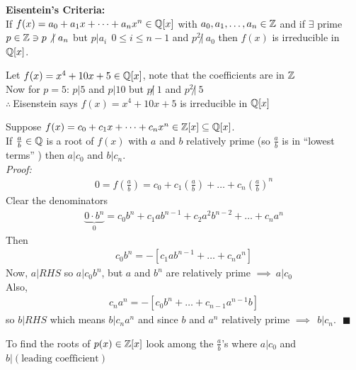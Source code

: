 \newpage
\begin{tcolorbox}
    \textbf{Eisentein's Criteria:} \\ \steezybreak 
    If $f(x)=a_0+a_1x+ \dots + a_n x^n \in {\mathbb{ Q}}[x]$ with $a_0, a_1, \dots, a_n \in {\mathbb{ Z}}$ and if $\exists$ prime $p\in {\mathbb{ Z}}\ni p \not | \ a_n$ but $p|a_i \ \ 0\leq i \leq n-1$ and $p^2 \not | \ a_0$ then $f(x)$ is irreducible in ${\mathbb{ Q}}[x]$.
\end{tcolorbox}
\begin{example}
    Let $f(x)= x^4 + 10x + 5 \in {\mathbb{ Q}}[x]$, note that the coefficients are in ${\mathbb{ Z}}$ \\
    Now for $p=5$: $p|5$ and $p|10$ but $p\not | \ 1$ and $p^2 \not | \ 5$ \\
    $\therefore \ $Eisenstein says $f(x)=x^4+10x+5$ is irreducible in ${\mathbb{ Q}}[x]$
\end{example}
\begin{lemma*}
    Suppose $f(x) = c_0 + c_1x + \dots + c_n x^n \in {\mathbb{ Z}}[x] \subseteq {\mathbb{ Q}}[x]$. \\
    If $\frac{a}{b} \in {\mathbb{ Q}}$ is a root of $f(x)$ with $a$ and $b$ relatively prime (so $\frac{a}{b}$ is in ``lowest terms'' ) then $a|c_0$ and $b|c_n$. \\

    \noindent \textit{Proof: }
    \begin{align*}
        0 = f\left(\frac{a}{b}\right)= c_0 + c_1\left(\frac{a}{b}\right) + \dots + c_n\left(\frac{a}{b}\right)^n
    \end{align*}
    Clear the denominators
    \begin{align*}
        \underbrace{0\cdot b^n}_{0} =  c_0b^n + c_1ab^{n-1} + c_2a^2b^{n-2} + \dots + c_na^n
    \end{align*}
    Then
    \begin{align*}
        c_0b^n = -[c_1ab^{n-1} + \dots + c_na^n]
    \end{align*}
    Now, $a|RHS$ so $a|c_0b^n$, but $a$ and $b^n$ are relatively prime $\implies \ a|c_0$ \\
    Also,
    \begin{align*}
        c_na^n = -[c_0b^n + \dots + c_{n-1}a^{n-1}b]
    \end{align*}
    so $b| RHS$ which means $b|c_na^n$ and since $b$ and $a^n$ relatively prime $\implies \ \ b|c_n. \ \ \ \blacksquare$
\end{lemma*}
To find the roots of $p(x) \in {\mathbb{ Z}}[x]$ look among the $\frac{a}{b}$'s where $a|c_0$ and $b|(\text{leading coefficient})$
